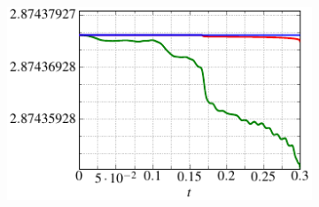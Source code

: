 \begin{figure}
\begin{subfigure}[]{0.48\linewidth}
  \caption{}
  \label{conservation_1D}
  \end{subfigure}\hfill%
  \begin{subfigure}[]{0.48\linewidth}
          \includegraphics[scale=1]{Figures/paper-figure13.pdf}

\end{subfigure}
\end{figure}
